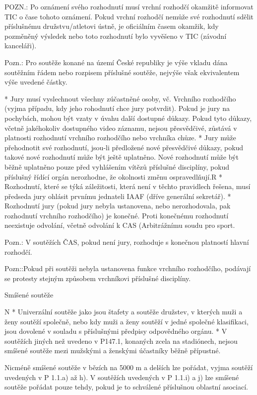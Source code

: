 POZN.: Po oznámení svého rozhodnutí musí vrchní rozhodčí okamžitě informovat TIC o čase tohoto oznámení. Pokud vrchní rozhodčí nemůže své rozhodnutí sdělit příslušnému družstvu/atletovi ústně, je oficiálním časem okamžik, kdy pozměněný výsledek nebo  toto rozhodnutí bylo vyvěšeno v TIC (závodní kanceláři).

Pozn.: Pro soutěže konané na území České republiky je výše vkladu dána soutěžním řádem nebo rozpisem příslušné soutěže, nejvýše však ekvivalentem výše uvedené částky.

* Jury musí vyslechnout všechny zúčastněné osoby, vč. Vrchního rozhodčího (vyjma případu, kdy jeho rohodnutí chce jury potvrdit). Pokud je jury na pochybách, mohou být vzaty v úvahu další dostupné důkazy. Pokud tyto důkazy, včetně jakéhokoliv dostupného video záznamu, nejsou přesvědčivé, zůstává v platnosti rozhodnutí vrchního rozhodčího nebo vrchníka chůze.
* Jury může přehodnotit své rozhodnutí, jsou-li předložené nové přesvědčivé důkazy, pokud takové nové rozhodnutí může být ještě uplatněno. Nové rozhodnutí může být běžně uplatněno pouze před vyhlášením vítězů příslušné disciplíny, pokud příslušný řídící orgán nerozhodne, že okolnosti změnu ospravedlňují.R
* Rozhodnutí, které se týká záležitosti, která není v těchto pravidlech řešena, musí předseda jury ohlásit prvnímu jednateli IAAF (dříve generální sekretář).
* Rozhodnutí jury (pokud jury nebyla ustanovena, nebo nerozhodovala, pak rozhodnutí vrchního rozhodčího) je konečné. Proti konečnému rozhodnutí neexistuje odvolání, včetně odvolání k CAS (Arbitrážnímu soudu pro sport.

Pozn.: V soutěžích ČAS, pokud není jury, rozhoduje s konečnou platností hlavní rozhodčí.

Pozn::Pokud při soutěži nebyla ustanovena funkce vrchního rozhodčího, podávají se protesty stejným způsobem vrchníkovi příslušné disciplíny.
\enditems

\secc Smíšené soutěže

\begitems \style N
* Univerzální soutěže jako jsou štafety a soutěže družstev, v kterých muži a ženy soutěží společně, nebo kdy muži a ženy soutěží v jedné společné klasifikaci, jsou dovolené v souladu s příslušnými předpisy odpovědného orgánu.
* V soutěžích jiných než uvedeno v P147.1, konaných zcela na stadiónech, nejsou smíšené soutěže mezi mužskými a ženskými účastníky běžně přípustné.

Nicméně smíšené soutěže v bězích na 5000 m a delších lze pořádat, vyjma soutěží uvedených v P 1.1.a) až h). V soutěžích uvedených v P 1.1.i) a j) lze smíšené soutěže pořádat pouze tehdy, pokud je to schválené příslušnou oblastní asociací.

